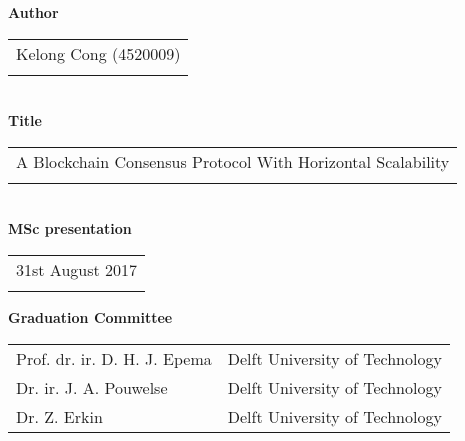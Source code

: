 \thispagestyle{empty}

\noindent \textbf{Author}\\
\begin{tabular}{l}
Kelong Cong (4520009)\\
\\
\end{tabular}\\
\noindent \textbf{Title}\\
\begin{tabular}{l}
A Blockchain Consensus Protocol With Horizontal Scalability\\
\\
\end{tabular}\\
\noindent \textbf{MSc presentation}\\
\begin{tabular}{l}
31st August 2017\\
\\
\end{tabular}

\vspace{1.1cm}

\noindent \textbf{Graduation Committee}\\
\begin{tabular}{ll}
Prof. dr. ir. D. H. J. Epema            & Delft University of Technology \\
Dr. ir. J. A. Pouwelse                  & Delft University of Technology \\
Dr. Z. Erkin                            & Delft University of Technology \\
\end{tabular}


